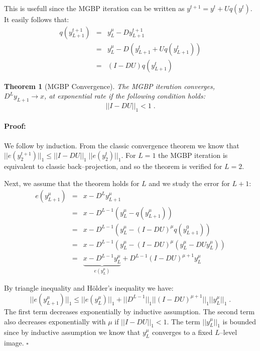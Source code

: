 \documentclass[letterpaper]{article}
\newtheorem{thm}{Theorem}
\newenvironment{proof}{\paragraph{Proof:}}{\hfill$\square$}
\begin{document}
This is usefull since the MGBP iteration can be written as $y^{t+1} = y^t + Uq(y^t)$. It easily follows that:
\begin{eqnarray}
    q(y^{t+1}_{L+1}) & = & y^\mu_L - D y^{t+1}_{L+1} \\
    & = & y^\mu_L - D (y^t_{L+1}+Uq(y^t_{L+1})) \\
    & = & (I-DU) q(y^t_{L+1})
\end{eqnarray}

\begin{thm}[MGBP Convergence] \label{thm:mgbp}
The MGBP iteration converges, $D^L y_{L+1}\rightarrow x$, at exponential rate if the following condition holds:
\begin{equation}
    ||I-DU||_1 < 1 \;.
\end{equation}
\end{thm}
\begin{proof}
    We follow by induction. From the classic convergence theorem we know that $||e(y^{t+1}_2)||_1 \leqslant ||I-DU||_1 \; ||e(y^t_2)||_1$. For $L=1$ the MGBP iteration is equivalent to classic back--projection, and so the theorem is verified for $L=2$.

    Next, we assume that the theorem holds for $L$ and we study the error for $L+1$:
    \begin{eqnarray}
        e(y^\mu_{L+1}) & = & x - D^L y^\mu_{L+1} \\
        & = & x - D^{L-1} (y^\mu_L - q(y^\mu_{L+1})) \\
        & = & x - D^{L-1} (y^\mu_L - (I-DU)^\mu q(y^0_{L+1})) \\
        & = & x - D^{L-1} (y^\mu_L - (I-DU)^\mu (y^\mu_L - DUy^\mu_L)) \\
        & = & \underbrace{x - D^{L-1} y^\mu_L}_{e(y^\mu_L)} + D^{L-1} (I-DU)^{\mu+1} y^\mu_L
    \end{eqnarray}

    By triangle inequality and H\"{o}lder's inequality we have:
    \begin{equation}
        ||e(y^\mu_{L+1})||_1 \leqslant ||e(y^\mu_L)||_1 + ||D^{L-1}||_1 ||(I-DU)^{\mu+1}||_1 ||y^\mu_L||_1 \;.
    \end{equation}
    The first term decreases exponentially by inductive assumption. The second term also decreases exponentially with $\mu$ if $||I-DU||_1 < 1$. The term $||y^\mu_L||_1$ is bounded since by inductive assumption we know that $y^\mu_L$ converges to a fixed $L$--level image.
\end{proof}
\end{document}
